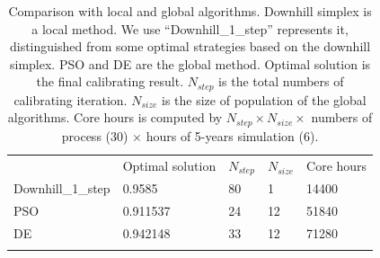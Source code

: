 \documentclass[gmd, manuscript]{copernicus}
\begin{document}

\begin{table}[t]
\caption{Comparison with local and global algorithms. Downhill simplex is a local method. We use ``Downhill\_1\_step'' represents it,  distinguished from some optimal strategies based on the downhill simplex. PSO and DE are the global method. Optimal solution is the final calibrating result. $N_{step}$ is the total numbers of calibrating iteration. $N_{size}$ is the size of population of the global algorithms. Core hours is computed by $N_{step} \times N_{size} \times$ numbers of process (30) $\times$ hours of 5-years simulation (6).}
\begin{tabular}{l l l l l}
\tophline
  & Optimal solution & $N_{step}$ & $N_{size}$ & Core hours \\
\middlehline
Downhill\_1\_step & 0.9585    & 80         & 1  & 14400 \\
PSO               & 0.911537  & 24         & 12 & 51840 \\
DE                & 0.942148  & 33         & 12 & 71280 \\
\bottomhline
\end{tabular}
\belowtable{} %
\end{table}
\end{document}
